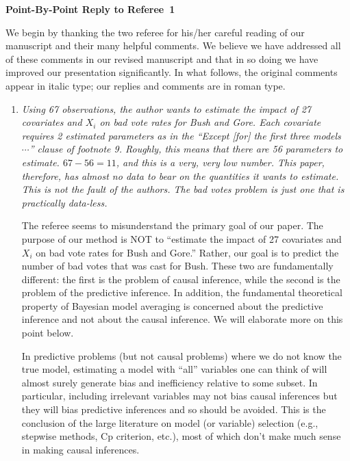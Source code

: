 \documentclass[11pt]{article}
\begin{document}
\begin{center}
  {\bf \Large Point-By-Point Reply to Referee~1}
\end{center}

We begin by thanking the two referee for his/her careful reading of
our manuscript and their many helpful comments. We believe we have
addressed all of these comments in our revised manuscript and that in
so doing we have improved our presentation significantly.  In what
follows, the original comments appear in italic type; our replies and
comments are in roman type.

\bigskip


\begin{enumerate}
  
\item {\it Using 67 observations, the author wants to estimate the
    impact of 27 covariates and $X_i$ on bad vote rates for Bush and
    Gore.  Each covariate requires 2 estimated parameters as in the
    ``Except [for] the first three models $\cdots$'' clause of
    footnote 9.  Roughly, this means that there are 56 parameters to
    estimate.  $67-56=11$, and this is a very, very low number. This
    paper, therefore, has almost no data to bear on the quantities it
    wants to estimate.  This is not the fault of the authors.  The bad
    votes problem is just one that is practically data-less.}
  
  \smallskip The referee seems to misunderstand the primary goal of
  our paper.  The purpose of our method is NOT to ``estimate the
  impact of 27 covariates and $X_i$ on bad vote rates for Bush and
  Gore.'' Rather, our goal is to predict the number of bad votes that
  was cast for Bush. These two are fundamentally different: the first
  is the problem of causal inference, while the second is the problem
  of the predictive inference. In
  addition, the fundamental theoretical property of Bayesian model
  averaging is concerned about the predictive inference and not about
  the causal inference. We will elaborate more on this point below.
  
  In predictive problems (but not causal problems) where we do not
  know the true model, estimating a model with ``all'' variables one
  can think of will almost surely generate bias and inefficiency
  relative to some subset.  In particular, including irrelevant
  variables may not bias causal inferences but they will bias
  predictive inferences and so should be avoided.  This is the
  conclusion of the large literature on model (or variable) selection
  (e.g., stepwise methods, Cp criterion, etc.), most of which don't
  make much sense in making causal inferences. 
  

\end{enumerate}
\end{document}

